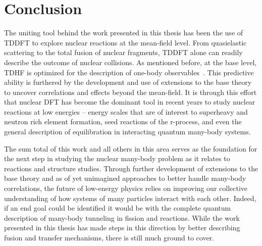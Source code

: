 

\section{Conclusion}
\label{sec:future_work_conclusion}
The uniting tool behind the work presented in this thesis has been the use of TDDFT to explore nuclear reactions at the mean-field level.
From quasielastic scattering to the total fusion of nuclear fragments, TDDFT alone can readily describe the outcome of nuclear collisions.
As mentioned before, at the base level, TDHF is optimized for the description of one-body observables~\cite{balian1981}.
This predictive ability is furthered by the development and use of extensions to the base theory to uncover correlations and effects beyond the mean-field.
It is through this effort that nuclear DFT has become the dominant tool in recent years to study nuclear reactions at low energies -- energy scales that are of interest to superheavy and neutron rich element formation, seed reactions of the r-process, and even the general description of equilibration in interacting quantum many-body systems.

The sum total of this work and all others in this area serves as the foundation for the next step in studying the nuclear many-body problem as it relates to reactions and structure studies.
Through further development of extensions to the base theory and as of yet unimagined approaches to better handle many-body correlations, the future of low-energy physics relies on improving our collective understanding of how systems of many particles interact with each other.
Indeed, if an end goal could be identified it would be with the complete quantum description of many-body tunneling in fission and reactions.
While the work presented in this thesis has made steps in this direction by better describing fusion and transfer mechanisms, there is still much ground to cover.